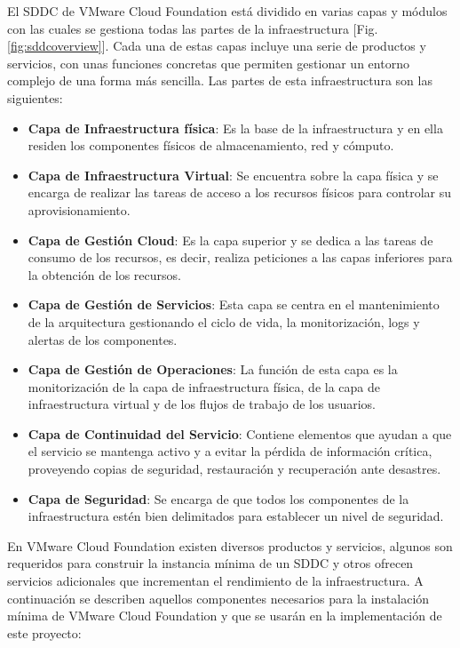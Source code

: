El SDDC de VMware Cloud Foundation está dividido en varias capas y módulos con las cuales se gestiona todas las partes de la infraestructura [Fig. \ref{fig:sddcoverview}]. Cada una de estas capas incluye una serie de productos y servicios, con unas funciones concretas que permiten gestionar un entorno complejo de una forma más sencilla. Las partes de esta infraestructura son las siguientes:
\begin{itemize}
    \item \textbf{Capa de Infraestructura física}: Es la base de la infraestructura y en ella residen los componentes físicos de almacenamiento, red y cómputo.
    \item \textbf{Capa de Infraestructura Virtual}: Se encuentra sobre la capa física y se encarga de realizar las tareas de acceso a los recursos físicos para controlar su aprovisionamiento.
    \item \textbf{Capa de Gestión Cloud}: Es la capa superior y se dedica a las tareas de consumo de los recursos, es decir, realiza peticiones a las capas inferiores para la obtención de los recursos.
    \item \textbf{Capa de Gestión de Servicios}: Esta capa se centra en el mantenimiento de la arquitectura gestionando el ciclo de vida, la monitorización, logs y alertas de los componentes. 
    \item \textbf{Capa de Gestión de Operaciones}: La función de esta capa es la monitorización de la capa de infraestructura física, de la capa de infraestructura virtual y de los flujos de trabajo de los usuarios.
    \item \textbf{Capa de Continuidad del Servicio}: Contiene elementos que ayudan a que el servicio se mantenga activo y a evitar la pérdida de información crítica, proveyendo copias de seguridad, restauración y recuperación ante desastres.
    \item \textbf{Capa de Seguridad}: Se encarga de que todos los componentes de la infraestructura estén bien delimitados para establecer un nivel de seguridad.
\end{itemize}

En VMware Cloud Foundation existen diversos productos y servicios, algunos son requeridos para construir la instancia mínima de un SDDC y otros ofrecen servicios adicionales que incrementan el rendimiento de la infraestructura. A continuación se describen aquellos componentes necesarios para la instalación mínima de VMware Cloud Foundation y que se usarán en la implementación de este proyecto:

